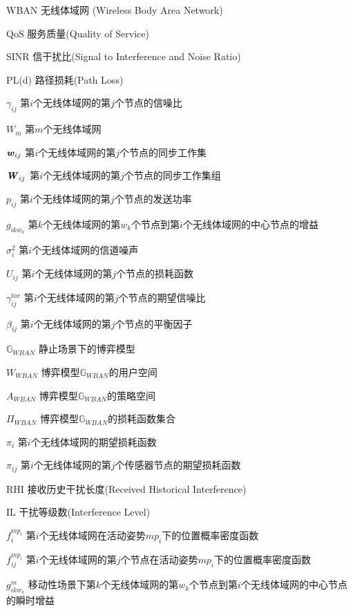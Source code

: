 ﻿\begin{denotation}

\item[WBAN] 无线体域网 (Wireless Body Area Network)
\item[QoS] 服务质量(Quality of Service)
\item[SINR]	信干扰比(Signal to Interference and Noise Ratio)
\item[PL(d)] 路径损耗(Path Loss)
\item[${\gamma _{ij}}$] 第$i$个无线体域网的第$j$个节点的信噪比
\item[$W_m$] 第$m$个无线体域网
\item[$\textbf{\emph{w}}_{ij}$] 第$i$个无线体域网的第$j$个节点的同步工作集
\item[$\textbf{\emph{W}}_{ij}$] 第$i$个无线体域网的第$j$个节点的同步工作集组
\item[$p_{ij}$] 第$i$个无线体域网的第$j$个节点的发送功率
\item[$g_{ikw_k}$] 第$k$个无线体域网的第$w_k$个节点到第$i$个无线体域网的中心节点的增益
\item[${{\sigma _{i}^2}}$] 第$i$个无线体域网的信道噪声
\item[$U_{ij}$] 第$i$个无线体域网的第$j$个节点的损耗函数
\item[$\gamma _{ij}^{tar}$] 第$i$个无线体域网的第$j$个节点的期望信噪比
\item[$\beta_{ij}$] 第$i$个无线体域网的第$j$个节点的平衡因子
\item[$\mathbb{G}_{WBAN}$] 静止场景下的博弈模型
\item[$W_{WBAN}$] 博弈模型$\mathbb{G}_{WBAN}$的用户空间
\item[$A_{WBAN}$] 博弈模型$\mathbb{G}_{WBAN}$的策略空间
\item[$\Pi_{WBAN}$] 博弈模型$\mathbb{G}_{WBAN}$的损耗函数集合
\item[${\pi _i}$] 第$i$个无线体域网的期望损耗函数
\item[${\pi _{ij}}$] 第$i$个无线体域网的第$j$个传感器节点的期望损耗函数
\item[RHI] 接收历史干扰长度(Received Historical Interference)
\item[IL] 干扰等级数(Interference Level)
\item[$f_{i}^{m{p_i}}$] 第$i$个无线体域网在活动姿势$mp_i$下的位置概率密度函数
\item[$f_{ij}^{m{p_i}}$] 第$i$个无线体域网的第$j$个节点在活动姿势$mp_i$下的位置概率密度函数
\item[$g_{ikw_k}^m$] 移动性场景下第$k$个无线体域网的第$w_k$个节点到第$i$个无线体域网的中心节点的瞬时增益

\end{denotation}
